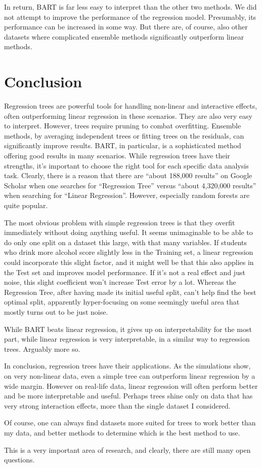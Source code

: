 \documentclass[12pt]{article}
\begin{document}
In return, BART is far less easy to interpret than the other two methods. We did not attempt to improve the performance of the regression model. Presumably, its performance can be increased in some way. But there are, of course, also other datasets where complicated ensemble methods significantly outperform linear methods.


\section{Conclusion}

Regression trees are powerful tools for handling non-linear and interactive effects, often outperforming linear regression in these scenarios. They are also very easy to interpret. However, trees require pruning to combat overfitting. Ensemble methods, by averaging independent trees or fitting trees on the residuals, can significantly improve results. BART, in particular, is a sophisticated method offering good results in many scenarios. While regression trees have their strengths, it's important to choose the right tool for each specific data analysis task. Clearly, there is a reason that there are ``about 188,000 results'' on Google Scholar when one searches for ``Regression Tree'' versus ``about 4,320,000 results'' when searching for ``Linear Regression''. However, especially random forests are quite popular.

The most obvious problem with simple regression trees is that they overfit immediately without doing anything useful. It seems unimaginable to be able to do only one split on a dataset this large, with that many variables. If students who drink more alcohol score slightly less in the Training set, a linear regression could incorporate this slight factor, and it might well be that this also applies in the Test set and improves model performance. If it's not a real effect and just noise, this slight coefficient won't increase Test error by a lot. Whereas the Regression Tree, after having made its initial useful split, can't help find the best optimal split, apparently hyper-focusing on some seemingly useful area that mostly turns out to be just noise.

While BART beats linear regression, it gives up on interpretability for the most part, while linear regression is very interpretable, in a similar way to regression trees. Arguably more so.

In conclusion, regression trees have their applications. As the simulations show, on very non-linear data, even a simple tree can outperform linear regression by a wide margin. However on real-life data, linear regression will often perform better and be more interpretable and useful. Perhaps trees shine only on data that has very strong interaction effects, more than the single dataset I considered.

Of course, one can always find datasets more suited for trees to work better than my data, and better methods to determine which is the best method to use.

This is a very important area of research, and clearly, there are still many open questions.



\end{document}
